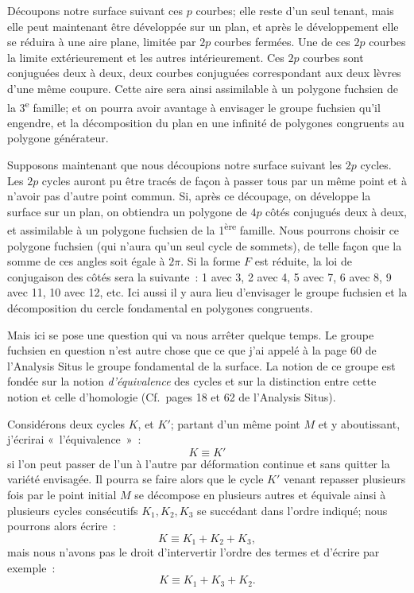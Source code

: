 \documentclass{article}
\begin{document}
Découpons notre surface suivant ces $p$ courbes; elle reste d'un seul tenant, mais elle peut maintenant être développée sur un plan, et après le développement elle se réduira à une aire plane, limitée par $2p$ courbes fermées. Une de ces $2p$ courbes la limite extérieurement et les autres intérieurement. Ces $2p$ courbes sont conjuguées deux à deux, deux courbes conjuguées correspondant aux deux lèvres d'une même coupure. Cette aire sera ainsi assimilable à un polygone fuchsien de la 3\textsuperscript{e} famille; et on pourra avoir avantage à envisager le groupe fuchsien qu'il engendre, et la décomposition du plan en une infinité de polygones congruents au polygone générateur.


Supposons maintenant que nous découpions notre surface suivant les $2p$ cycles. Les $2p$ cycles auront pu être tracés de façon à passer tous par un même point et à n'avoir pas d'autre point commun. Si, après ce découpage, on développe la surface sur un plan, on obtiendra un polygone de $4p$ côtés conjugués deux à deux, et assimilable à un polygone fuchsien de la 1\textsuperscript{ère} famille. Nous pourrons choisir ce polygone fuchsien (qui n'aura qu'un seul cycle de sommets), de telle façon que la somme de ces angles soit égale à $2\pi$. Si la forme $F$ est réduite, la loi de conjugaison des côtés sera la suivante~: 1 avec 3, 2 avec 4, 5 avec 7, 6 avec 8, 9 avec 11, 10 avec 12, etc. Ici aussi il y aura lieu d'envisager le groupe fuchsien et la décomposition du cercle fondamental en polygones congruents.

Mais ici se pose une question qui va nous arrêter quelque temps. Le groupe fuchsien en question n'est autre chose que ce que j'ai appelé à la page 60 de l'Analysis Situs le groupe fondamental de la surface. La notion de ce groupe est fondée sur la notion \emph{d'équivalence} des cycles et sur la distinction entre cette notion et celle d'homologie (Cf.\ pages 18 et 62 de l'Analysis Situs).

Considérons deux cycles $K$, et $K'$; partant d'un même point $M$ et y aboutissant, j'écrirai «~l'équivalence~»~:
\[ K \equiv K' \]
si l'on peut passer de l'un à l'autre par déformation continue et sans quitter la variété envisagée. Il pourra se faire alors que le cycle $K'$ venant repasser plusieurs fois par le point initial $M$ se décompose en plusieurs autres et équivale ainsi à plusieurs cycles consécutifs $K_{1}, K_{2}, K_{3}$ se succédant dans l'ordre indiqué; nous pourrons alors écrire~:
\[ K \equiv K_{1} + K_{2} + K_{3}, \]
mais nous n'avons pas le droit d'intervertir l'ordre des termes et d'écrire par exemple~:
\[ K \equiv K_{1} + K_{3} + K_{2}. \]
\end{document}
